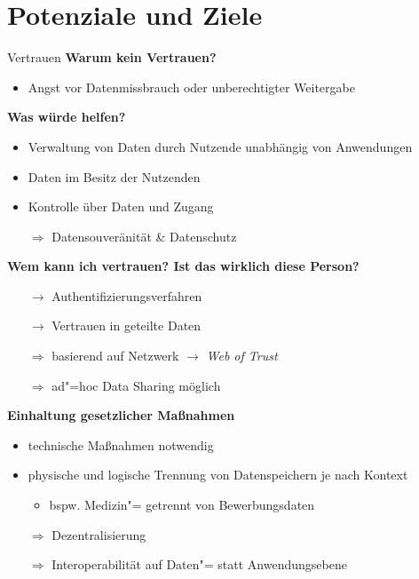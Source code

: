 
\section{Potenziale und Ziele}

\begin{frame}[allowframebreaks]{Vertrauen}
    \textbf{Warum kein Vertrauen?}
    \begin{itemize}
        \item Angst vor Datenmissbrauch oder unberechtigter Weitergabe~\cite{mollerIndustrialDataEcosystems2024}
    \end{itemize}

    \textbf{Was würde helfen?}
    \begin{itemize}
        \item Verwaltung von Daten durch Nutzende unabhängig von Anwendungen
        \item Daten im Besitz der Nutzenden
        \item Kontrolle über Daten und Zugang
        \item[$\Rightarrow$] Datensouveränität \& Datenschutz
    \end{itemize}

    \framebreak

    \textbf{Wem kann ich vertrauen? Ist das wirklich diese Person?}
    \begin{itemize}
        \item[$\to$] Authentifizierungsverfahren
        \item[$\to$] Vertrauen in geteilte Daten
        \item[$\Rightarrow$] basierend auf Netzwerk $\to$ \emph{Web of Trust}
        \item[$\Rightarrow$] ad"=hoc Data Sharing möglich
    \end{itemize}

    \framebreak

    \textbf{Einhaltung gesetzlicher Maßnahmen}
    \begin{itemize}
        \item technische Maßnahmen notwendig
        
        \item physische und logische Trennung von Datenspeichern je nach Kontext
        \begin{itemize}
            \item bspw. Medizin"= getrennt von Bewerbungsdaten
        \end{itemize}

        \item[$\Rightarrow$] Dezentralisierung
        \item[$\Rightarrow$] Interoperabilität auf Daten"= statt Anwendungsebene
    \end{itemize}
\end{frame}


